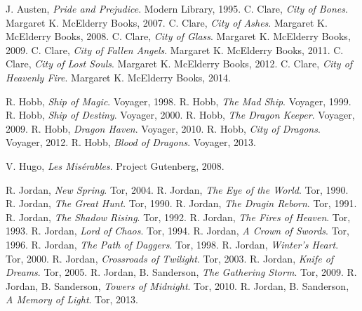 \renewcommand{\bibname}{Analyzed books}
\begin{thebibliography}{99} 

	\makeatletter
	\addtocounter{\@listctr}{83}
	\makeatother

     J. Austen,
    \emph{Pride and Prejudice}.
    Modern Library,
    1995.
    C. Clare,
    \emph{City of Bones}.
    Margaret K. McElderry Books,
    2007.
    C. Clare,
    \emph{City of Ashes}.
    Margaret K. McElderry Books,
    2008.
    C. Clare,
    \emph{City of Glass}.
    Margaret K. McElderry Books,
    2009.
    C. Clare,
    \emph{City of Fallen Angels}.
    Margaret K. McElderry Books,
    2011.
    C. Clare,
    \emph{City of Lost Souls}.
    Margaret K. McElderry Books,
    2012.
    C. Clare,
    \emph{City of Heavenly Fire}.
    Margaret K. McElderry Books,
    2014.

    R. Hobb,
    \emph{Ship of Magic}.
    Voyager,
    1998.
    R. Hobb,
    \emph{The Mad Ship}.
    Voyager,
    1999.
    R. Hobb,
    \emph{Ship of Destiny}.
    Voyager,
    2000.
    R. Hobb,
    \emph{The Dragon Keeper}.
    Voyager,
    2009.
    R. Hobb,
    \emph{Dragon Haven}.
    Voyager,
    2010.
    R. Hobb,
    \emph{City of Dragons}.
    Voyager,
    2012.
    R. Hobb,
    \emph{Blood of Dragons}.
    Voyager,
    2013.

    V. Hugo,
    \emph{Les Mis\'{e}rables}.
    Project Gutenberg, 
    2008. 
            
    R. Jordan,
    \emph{New Spring}.
    Tor,
    2004.
    R. Jordan,
    \emph{The Eye of the World}.
    Tor,
    1990.
    R. Jordan,
    \emph{The Great Hunt}.
    Tor,
    1990.
    R. Jordan,
    \emph{The Dragin Reborn}.
    Tor,
    1991.
    R. Jordan,
    \emph{The Shadow Rising}.
    Tor,
    1992.
    R. Jordan,
    \emph{The Fires of Heaven}.
    Tor,
    1993.
    R. Jordan,
    \emph{Lord of Chaos}.
    Tor,
    1994.
    R. Jordan,
    \emph{A Crown of Swords}.
    Tor,
    1996.
    R. Jordan,
    \emph{The Path of Daggers}.
    Tor,
    1998.
    R. Jordan,
    \emph{Winter's Heart}.
    Tor,
    2000.
    R. Jordan,
    \emph{Crossroads of Twilight}.
    Tor,
    2003.
    R. Jordan,
    \emph{Knife of Dreams}.
    Tor,
    2005.
    R. Jordan, B. Sanderson,
    \emph{The Gathering Storm}.
    Tor,
    2009.
    R. Jordan, B. Sanderson,
    \emph{Towers of Midnight}.
    Tor,
    2010.
    R. Jordan, B. Sanderson,
    \emph{A Memory of Light}.
    Tor,
    2013.


\end{thebibliography}
